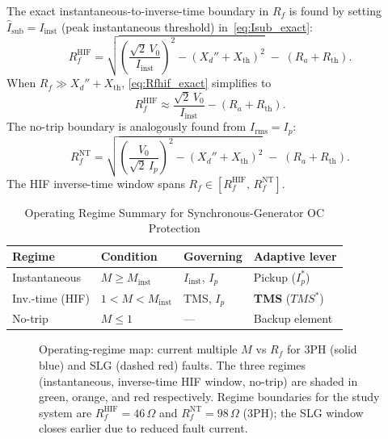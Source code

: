 \documentclass[10pt,journal,twoside]{IEEEtran}
\newcommand{\Rf}{R_{\!f}}
\newcommand{\tmss}{TMS^*}
\begin{document}
\noindent
The exact instantaneous-to-inverse-time boundary in $\Rf$ is found by
setting $\hat{I}_{\mathrm{sub}} = I_{\mathrm{inst}}$ (peak instantaneous
threshold) in~\eqref{eq:Isub_exact}:
\begin{equation}
R_f^{\mathrm{HIF}} =
  \sqrt{\!\left(\frac{\sqrt{2}\,V_0}{I_{\mathrm{inst}}}\right)^{\!2}
  - (X_d'' + X_{\mathrm{th}})^2}
  \;-\; (R_a + R_{\mathrm{th}}).
\label{eq:Rfhif_exact}
\end{equation}
When $\Rf \gg X_d'' + X_{\mathrm{th}}$, \eqref{eq:Rfhif_exact} simplifies to
\begin{equation}
R_f^{\mathrm{HIF}} \approx \frac{\sqrt{2}\,V_0}{I_{\mathrm{inst}}}
  - (R_a + R_{\mathrm{th}}).
\label{eq:Rfhif}
\end{equation}
The no-trip boundary is analogously found from $I_{\mathrm{rms}} = I_p$:
\begin{equation}
R_f^{\mathrm{NT}} =
  \sqrt{\!\left(\frac{V_0}{\sqrt{2}\,I_p}\right)^{\!2}
  - (X_d'' + X_{\mathrm{th}})^2}
  \;-\; (R_a + R_{\mathrm{th}}).
\label{eq:RfNT}
\end{equation}
The HIF inverse-time window spans
$\Rf \in [R_f^{\mathrm{HIF}},\, R_f^{\mathrm{NT}}]$.

\begin{table}[!t]
\centering
\caption{Operating Regime Summary for Synchronous-Generator OC Protection}
\label{tab:regimes}
\begin{tabular}{@{}llll@{}}
\toprule
Regime & Condition & Governing & Adaptive lever \\
\midrule
Instantaneous  & $M \geq M_{\mathrm{inst}}$        & $I_{\mathrm{inst}}$, $I_p$ & Pickup ($I_p^*$) \\
Inv.-time (HIF)& $1 < M < M_{\mathrm{inst}}$        & TMS, $I_p$    & \textbf{TMS} ($\tmss$) \\
No-trip        & $M \leq 1$                          & ---           & Backup element \\
\bottomrule
\end{tabular}
\end{table}

\begin{figure}[!t]
\centering

\caption{Operating-regime map: current multiple $M$ vs $\Rf$ for 3PH
  (solid blue) and SLG (dashed red) faults.  The three regimes (instantaneous,
  inverse-time HIF window, no-trip) are shaded in green, orange, and red
  respectively.  Regime boundaries for the study system are
  $R_f^{\mathrm{HIF}} = 46\,\Omega$ and $R_f^{\mathrm{NT}} = 98\,\Omega$
  (3PH); the SLG window closes earlier due to reduced fault current.}
\label{fig:regime_map}
\end{figure}
\end{document}
